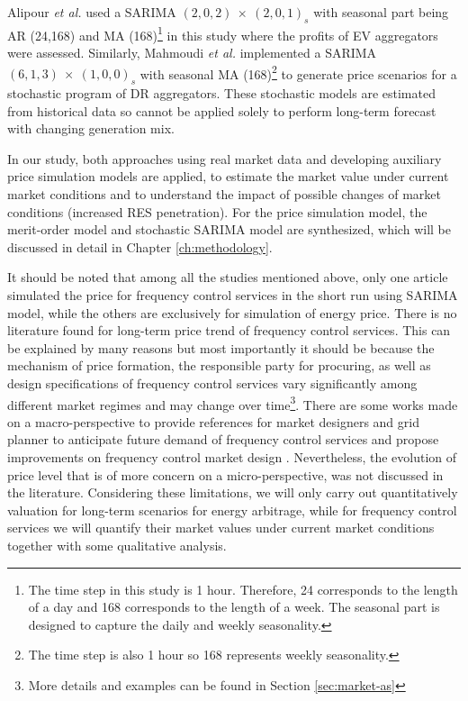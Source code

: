 Alipour \textit{et al.} used a SARIMA $(2,0,2)~\times~(2,0,1)_s$ with seasonal part being AR (24,168) and MA (168)\footnote{The time step in this study is 1 hour. Therefore, 24 corresponds to the length of a day and 168 corresponds to the length of a week. The seasonal part is designed to capture the daily and weekly seasonality.} in this study where the profits of EV aggregators were assessed. Similarly, Mahmoudi \textit{et al.} \cite{Mahmoudi2017} implemented a SARIMA $(6,1,3)~\times~(1,0,0)_s$ with seasonal MA (168)\footnote{The time step is also 1 hour so 168 represents weekly seasonality.} to generate price scenarios for a stochastic program of DR aggregators. These stochastic models are estimated from historical data so cannot be applied solely to perform long-term forecast with changing generation mix.

In our study, both approaches using real market data and developing auxiliary price simulation models are applied, to estimate the market value under current market conditions and to understand the impact of possible changes of market conditions (increased RES penetration). For the price simulation model, the merit-order model and stochastic SARIMA model are synthesized, which will be discussed in detail in Chapter \ref{ch:methodology}.

It should be noted that among all the studies mentioned above, only one article \cite{Alipour2017} simulated the price for frequency control services in the short run using SARIMA model, while the others are exclusively for simulation of energy price. There is no literature found for long-term price trend of frequency control services. This can be explained by many reasons but most importantly it should be because the mechanism of price formation, the responsible party for procuring, as well as design specifications of frequency control services vary significantly among different market regimes and may change over time\footnote{More details and examples can be found in Section  \ref{sec:market-as}}. There are some works made on a macro-perspective to provide references for market designers and grid planner to anticipate future demand of frequency control services and propose improvements on frequency control market design \cite{GEEnergyConsulting2014,Scherer2016,Krad2017}. Nevertheless, the evolution of price level that is of more concern on a micro-perspective, was not discussed in the literature. Considering these limitations, we will only carry out quantitatively valuation for long-term scenarios for energy arbitrage, while for frequency control services we will quantify their market values under current market conditions together with some qualitative analysis.

